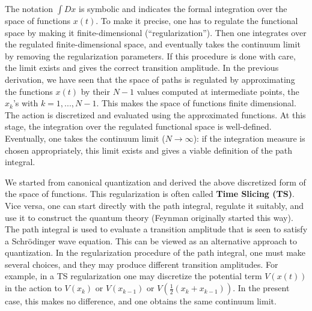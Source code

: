 The notation $\int Dx$ is symbolic and indicates the formal integration over the space of functions $x(t)$. To make it precise, one has to regulate the functional space by making it finite-dimensional (``regularization''). Then one integrates over the regulated finite-dimensional space, and eventually takes the continuum limit by removing the regularization parameters. If this procedure is done with care, the limit exists and gives the correct transition amplitude. In the previous derivation, we have seen that the space of paths is regulated by approximating the functions $x(t)$ by their $N-1$ values computed at intermediate points, the $x_k$'s with $k=1, ..., N-1$. This makes the space of functions finite dimensional. The action is discretized and evaluated using the approximated functions. At this stage, the integration over the regulated functional space is well-defined. Eventually, one takes the continuum limit ($N \to \infty$): if the integration measure is chosen appropriately, this limit exists and gives a viable definition of the path integral.

We started from canonical quantization and derived the above discretized form of the space of functions. This regularization is often called \textbf{Time Slicing (TS)}. Vice versa, one can start directly with the path integral, regulate it suitably, and use it to construct the quantum theory (Feynman originally started this way). The path integral is used to evaluate a transition amplitude that is seen to satisfy a Schrödinger wave equation. This can be viewed as an alternative approach to quantization. In the regularization procedure of the path integral, one must make several choices, and they may produce different transition amplitudes. For example, in a TS regularization one may discretize the potential term $V(x(t))$ in the action to $V(x_k)$ or $V(x_{k-1})$ or $V(\frac{1}{2}(x_k + x_{k-1}))$. In the present case, this makes no difference, and one obtains the same continuum limit.

